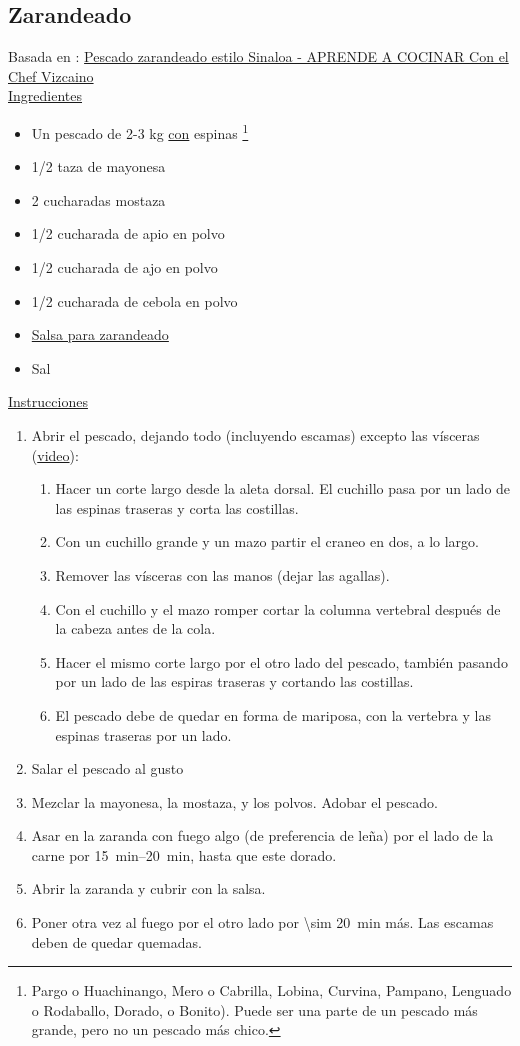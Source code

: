 \subsection{Zarandeado}

Basada en : \href{https://aprendeacocinarfacil.wordpress.com/2012/03/13/pescado-sarandeado-estilo-sinaloa-aya-pinchi/}{Pescado zarandeado estilo Sinaloa - APRENDE A COCINAR Con el Chef Vizcaino} \\

\underline{Ingredientes}
\begin{itemize}
\item Un pescado de 2-3 kg \underline{con} espinas \footnote{Pargo o Huachinango, Mero o Cabrilla, Lobina, Curvina, Pampano, Lenguado o Rodaballo, Dorado, o Bonito). Puede ser una parte de un pescado más grande, pero no un pescado más chico.}
\item 1/2 taza de mayonesa
\item 2 cucharadas mostaza
\item 1/2 cucharada de apio en polvo
\item 1/2 cucharada de ajo en polvo
\item 1/2 cucharada de cebola en polvo
\item \hyperref[salsa-zarandeado]{Salsa para zarandeado}
\item Sal
\end{itemize}


\underline{Instrucciones}
\begin{enumerate}
\item Abrir el pescado, dejando todo (incluyendo escamas) excepto las vísceras (\href{https://www.youtube.com/watch?v=_OmdFQWyWRc}{video}):
\begin{enumerate}
\item Hacer un corte largo desde la aleta dorsal. El cuchillo pasa por un lado de las espinas traseras y corta las costillas.
\item Con un cuchillo grande y un mazo partir el craneo en dos, a lo largo.
\item Remover las vísceras con las manos (dejar las agallas).
\item Con el cuchillo y el mazo romper cortar la columna vertebral después de la cabeza antes de la cola.
\item Hacer el mismo corte largo por el otro lado del pescado, también pasando por un lado de las espiras traseras y cortando las costillas.
\item El pescado debe de quedar en forma de mariposa, con la vertebra y las espinas traseras por un lado.
\end{enumerate}
\item Salar el pescado al gusto
\item Mezclar la mayonesa, la mostaza, y los polvos. Adobar el pescado.
\item Asar en la zaranda con fuego algo (de preferencia de leña) por el lado de la carne por \SIrange{15}{20}{min}, hasta que este dorado.
\item Abrir la zaranda y cubrir con la salsa.
\item Poner otra vez al fuego por el otro lado por \SI{\sim 20}{min} más. Las escamas deben de quedar quemadas.
\end{enumerate}
